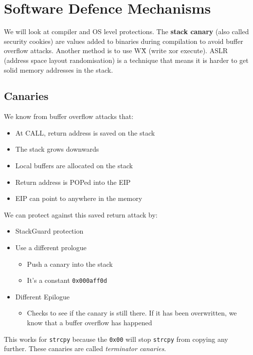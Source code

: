 \documentclass[11pt,a4paper,titlepage,dvipsnames,cmyk]{scrartcl}
\begin{document}
\section{Software Defence Mechanisms}
We will look at compiler and OS level protections. The \textbf{stack canary} (also called security cookies) are values added to binaries during compilation to avoid buffer overflow attacks. Another method is to use W\^X (write xor execute). ASLR (address space layout randomisation) is a technique that means it is harder to get solid memory addresses in the stack.

\subsection{Canaries}
We know from buffer overflow attacks that:
\begin{itemize}
    \item At CALL, return address is saved on the stack
    \item The stack grows downwards
    \item Local buffers are allocated on the stack
    \item Return address is POPed into the EIP
    \item EIP can point to anywhere in the memory
\end{itemize}

We can protect against this saved return attack by:
\begin{itemize}
    \item StackGuard protection
    \item Use a different prologue
    \begin{itemize}
        \item Push a canary into the stack
        \item It's a constant \texttt{0x000aff0d}
    \end{itemize}
    \item Different Epilogue
    \begin{itemize}
        \item Checks to see if the canary is still there. If it has been overwritten, we know that a buffer overflow has happened
    \end{itemize}
\end{itemize}

This works for \texttt{strcpy} because the \texttt{0x00} will stop \texttt{strcpy} from copying any further. These canaries are called \textit{terminator canaries}.
\end{document}
